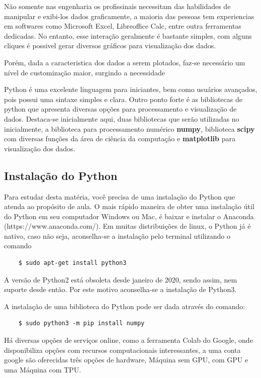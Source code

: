 Não somente nas engenharia os profissinais necessitam das habilidades de manipular e exibi-los dados graficamente, 
a maioria das pessoas tem experiencias em softwares como Microsoft Excel, Libreoffice Calc, entre outra ferramentas dedicadas.
No entanto, esse interação geralmente é bastante simples, com alguns cliques é possivel gerar diversos gráficos para visualização dos dados.

Porém, dada a caracteristica dos dados a serem plotados, faz-se necessário um nível de customização maior, surgindo a necessidade

Python é uma excelente linguagem para iniciantes, bem como usuários avançados, pois possui uma sintaxe simples e clara. Outro ponto
forte é as bibliotecas de python que apresenta diversas opções para processamento e visualização de dados. Destaca-se inicialmente aqui, duas
bibliotecas que serão utilizadas no inicialmente, a biblioteca para processamento numérico \textbf{numpy}, biblioteca \textbf{scipy} com diversas
funções da área de ciência da computação e  \textbf{matplotlib} para visualização dos dados.

\subsection{Instalação do Python}

Para estudar desta matéria, você precisa de uma instalação do Python que atenda ao propósito de aula. O mais rápido
maneira de obter uma instalação útil do Python em seu computador Windows ou Mac,
é baixar e instalar o Anaconda (https://www.anaconda.com/). Em muitas distribuições de linux, o Python já é nativo,
caso não seja, aconselha-se a instalação pelo terminal utilizando o comando
\begin{lstlisting}
    $ sudo apt-get install python3
\end{lstlisting}

A versão de Python2 está obsoleta desde janeiro de 2020, sendo assim, nem suporte desde então. Por este motivo aconselha-se
a instalação de Python3.

A instalação de uma biblioteca do Python pode ser dada através do comando:
\begin{lstlisting}
    $ sudo python3 -m pip install numpy
\end{lstlisting}

Há diversas opções de serviços online, como a ferramenta Colab do Google, onde disponibiliza opções com recursos computacionais interessantes,
a uma conta google são oferecidas três opções de hardware, Máquina sem GPU, com GPU e uma Máquina com TPU.

